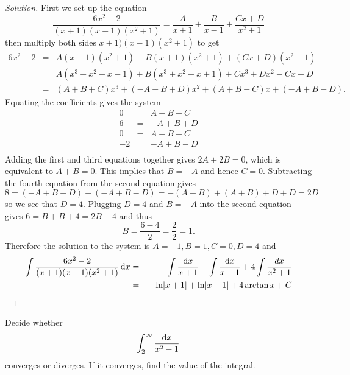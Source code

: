 \documentclass[12pt]{amsart}
\begin{document}
\begin{proof}[Solution]
  First we set up the equation
  \[\frac{6x^2 - 2}{(x + 1)(x - 1)(x^2 + 1)} = \frac{A}{x+1} + \frac{B}{x - 1} + \frac{Cx + D}{x^2 + 1}\]
  then multiply both sides \(x+1)(x - 1)(x^2 + 1)\) to get
  \begin{eqnarray*}
    6x^2 - 2 &=& A(x - 1)(x^2 + 1) + B(x + 1)(x^2 + 1) + (Cx + D)(x^2 - 1)\\
    &=& A(x^3 - x^2 + x - 1) + B(x^3 + x^2 + x + 1) + Cx^3 + Dx^2 - Cx - D\\
    &=& (A + B + C)x^3 + (-A + B + D)x^2 + (A + B - C)x + (-A + B -D).
  \end{eqnarray*}
  Equating the coefficients gives the system
  \begin{eqnarray*}
    0 &=& A + B + C\\
    6 &=& -A + B + D\\
    0 &=& A + B - C\\
    -2 &=& -A + B - D\\
  \end{eqnarray*}
  Adding the first and third equations together gives \(2A + 2B = 0\), which is equivalent to \(A + B = 0\).
  This implies that \(B = -A\) and hence \(C = 0\).
  Subtracting the fourth equation from the second equation gives
  \[8 = (-A + B + D) - (-A + B - D) = -(A + B) + (A + B) + D + D = 2D\]
  so we see that \(D = 4\).
  Plugging \(D = 4\) and \(B = -A\) into the second equation gives
  \(6 = B + B + 4 = 2B + 4\)
  and thus
  \[B = \frac{6 - 4}{2} = \frac{2}{2} = 1.\]
  Therefore the solution to the system is \(A = -1, B = 1, C = 0, D = 4\) and
  \begin{eqnarray*}
    \int \frac{6x^2 - 2}{(x + 1)(x - 1)(x^2 + 1)}\dif x &=& -\int\frac{\dif x}{x + 1} + \int \frac{\dif x}{x - 1} + 4\int\frac{dx}{x^2 + 1}\\
    &=& -\ln\abs{x + 1} + \ln\abs{x - 1} + 4\arctan{x} + C
  \end{eqnarray*}
\end{proof}

\begin{thm}[20 Points]
  Decide whether 
  \[\int_2^\infty \frac{\dif x}{x^2 - 1}\]
  converges or diverges.
  If it converges, find the value of the integral.
\end{thm}
\end{document}
